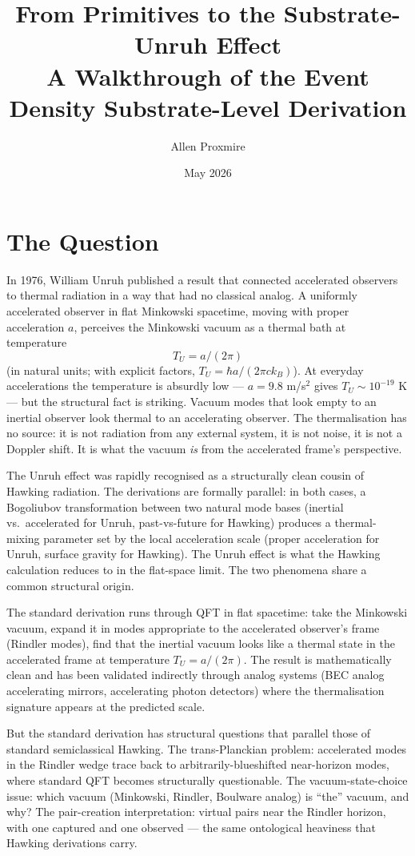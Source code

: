 \documentclass[11pt,a4paper]{article}
\title{\vspace{-1cm}\Large\bfseries From Primitives to the Substrate-Unruh Effect\\[6pt]
\large\mdseries A Walkthrough of the Event Density Substrate-Level Derivation}
\author{Allen Proxmire}
\date{May 2026}
\begin{document}
\maketitle

\section{The Question}

In 1976, William Unruh published a result that connected accelerated observers to thermal radiation in a way that had no classical analog. A uniformly accelerated observer in flat Minkowski spacetime, moving with proper acceleration $a$, perceives the Minkowski vacuum as a thermal bath at temperature
\[
T_U = a / (2\pi)
\]
(in natural units; with explicit factors, $T_U = \hbar a / (2\pi c k_B)$). At everyday accelerations the temperature is absurdly low --- $a = 9.8$ m/s$^2$ gives $T_U \sim 10^{-19}$ K --- but the structural fact is striking. Vacuum modes that look empty to an inertial observer look thermal to an accelerating observer. The thermalisation has no source: it is not radiation from any external system, it is not noise, it is not a Doppler shift. It is what the vacuum \emph{is} from the accelerated frame's perspective.

The Unruh effect was rapidly recognised as a structurally clean cousin of Hawking radiation. The derivations are formally parallel: in both cases, a Bogoliubov transformation between two natural mode bases (inertial vs.\ accelerated for Unruh, past-vs-future for Hawking) produces a thermal-mixing parameter set by the local acceleration scale (proper acceleration for Unruh, surface gravity for Hawking). The Unruh effect is what the Hawking calculation reduces to in the flat-space limit. The two phenomena share a common structural origin.

The standard derivation runs through QFT in flat spacetime: take the Minkowski vacuum, expand it in modes appropriate to the accelerated observer's frame (Rindler modes), find that the inertial vacuum looks like a thermal state in the accelerated frame at temperature $T_U = a/(2\pi)$. The result is mathematically clean and has been validated indirectly through analog systems (BEC analog accelerating mirrors, accelerating photon detectors) where the thermalisation signature appears at the predicted scale.

But the standard derivation has structural questions that parallel those of standard semiclassical Hawking. The trans-Planckian problem: accelerated modes in the Rindler wedge trace back to arbitrarily-blueshifted near-horizon modes, where standard QFT becomes structurally questionable. The vacuum-state-choice issue: which vacuum (Minkowski, Rindler, Boulware analog) is ``the'' vacuum, and why? The pair-creation interpretation: virtual pairs near the Rindler horizon, with one captured and one observed --- the same ontological heaviness that Hawking derivations carry.
\end{document}
